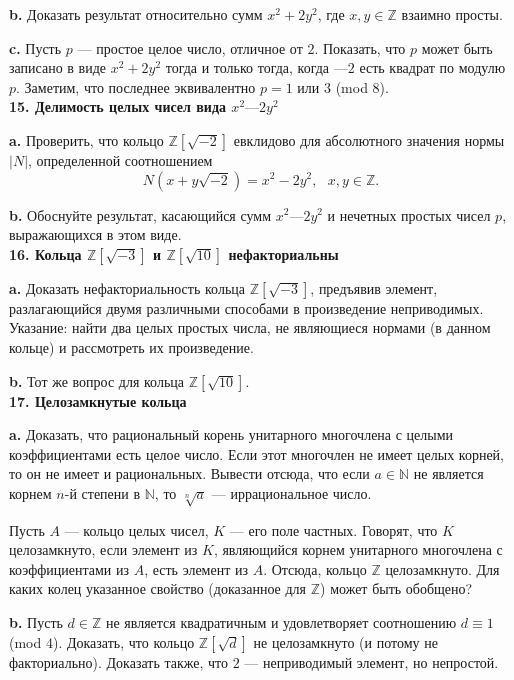 \documentclass{mai_book}
\begin{document}
\textbf{b.} Доказать результат относительно сумм $x^2 + 2 y^2$, где $x,y \in \mathbb{Z}$ взаимно просты.

\textbf{c.} Пусть $p$ — простое целое число, отличное от $2$. Показать, что
$p$ может быть записано в виде $x^2 + 2 y^2$ тогда и только тогда, когда
$—2$ есть квадрат по модулю $p$. Заметим, что последнее эквивалентно
$p = 1$ или $3$ (mod $8$).
\\

\noindent \textbf{15. Делимость целых чисел вида $x^2 — 2 y^2$}

\textbf{a.} Проверить, что кольцо $\mathbb{Z}[\sqrt{-2}]$ евклидово для абсолютного значения нормы $|N|$, определенной соотношением
\[
N(x+y\sqrt{-2})=x^2-2 y^2, \text{ } x,y \in \mathbb{Z}.
\]

\textbf{b.} Обоснуйте результат, касающийся сумм $x^2 — 2 y^2$ и нечетных
простых чисел $p$, выражающихся в этом виде.
\\

\noindent \textbf{16. Кольца $\mathbb{Z}[\sqrt{-3}]$ и $\mathbb{Z}[\sqrt{10}]$ нефакториальны}

\textbf{a.} Доказать нефакториальность кольца $\mathbb{Z}[\sqrt{-3}]$, предъявив элемент, разлагающийся двумя различными способами в произведение 
неприводимых. Указание: найти два целых простых числа, не являющиеся
нормами (в данном кольце) и рассмотреть их произведение.

\textbf{b.} Тот же вопрос для кольца $\mathbb{Z}[\sqrt{10}]$.
\\

\noindent \textbf{17. Целозамкнутые кольца}

\textbf{a.} Доказать, что рациональный корень унитарного многочлена с
целыми коэффициентами есть целое число. Если этот многочлен не
имеет целых корней, то он не имеет и рациональных. Вывести отсюда,
что если $a \in \mathbb{N}$ не является корнем $n$-й степени в $\mathbb{N}$, то $\sqrt[n]{a}$ — иррациональное число.

Пусть $A$ — кольцо целых чисел, $K$ — его поле частных. Говорят, что
$K$ целозамкнуто, если элемент из $K$, являющийся корнем унитарного
многочлена с коэффициентами из $A$, есть элемент из $A$. Отсюда, 
кольцо $\mathbb{Z}$ целозамкнуто. Для каких колец указанное свойство (доказанное для $\mathbb{Z}$) может быть обобщено?

\textbf{b.} Пусть $d \in \mathbb{Z}$ не является квадратичным и удовлетворяет 
соотношению $d \equiv 1$ (mod $4$). Доказать, что кольцо $\mathbb{Z}[\sqrt{d}]$ не целозамкнуто (и потому не факториально). Доказать также, что $2$ — неприводимый элемент, но непростой.
\end{document}
